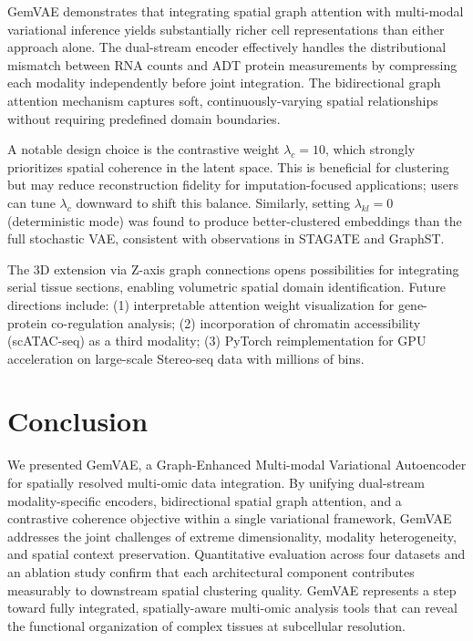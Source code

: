 \documentclass[conference]{IEEEtran}
\begin{document}
GemVAE demonstrates that integrating spatial graph attention with multi-modal variational inference yields substantially richer cell representations than either approach alone. The dual-stream encoder effectively handles the distributional mismatch between RNA counts and ADT protein measurements by compressing each modality independently before joint integration. The bidirectional graph attention mechanism captures soft, continuously-varying spatial relationships without requiring predefined domain boundaries.

A notable design choice is the contrastive weight $\lambda_c = 10$, which strongly prioritizes spatial coherence in the latent space. This is beneficial for clustering but may reduce reconstruction fidelity for imputation-focused applications; users can tune $\lambda_c$ downward to shift this balance. Similarly, setting $\lambda_{kl} = 0$ (deterministic mode) was found to produce better-clustered embeddings than the full stochastic VAE, consistent with observations in STAGATE and GraphST.

The 3D extension via Z-axis graph connections opens possibilities for integrating serial tissue sections, enabling volumetric spatial domain identification. Future directions include: (1) interpretable attention weight visualization for gene-protein co-regulation analysis; (2) incorporation of chromatin accessibility (scATAC-seq) as a third modality; (3) PyTorch reimplementation for GPU acceleration on large-scale Stereo-seq data with millions of bins.

\section{Conclusion}

We presented GemVAE, a Graph-Enhanced Multi-modal Variational Autoencoder for spatially resolved multi-omic data integration. By unifying dual-stream modality-specific encoders, bidirectional spatial graph attention, and a contrastive coherence objective within a single variational framework, GemVAE addresses the joint challenges of extreme dimensionality, modality heterogeneity, and spatial context preservation. Quantitative evaluation across four datasets and an ablation study confirm that each architectural component contributes measurably to downstream spatial clustering quality. GemVAE represents a step toward fully integrated, spatially-aware multi-omic analysis tools that can reveal the functional organization of complex tissues at subcellular resolution.
\end{document}
